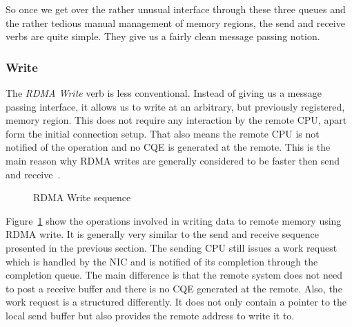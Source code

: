 So once we get over the rather unusual interface through these three queues and the rather tedious manual management of 
memory regions, the send and receive verbs are quite simple. They give us a fairly clean message passing notion.


\subsubsection{Write} \label{sec:bg:write}

The \emph{RDMA Write} verb is less conventional. Instead of giving us a message passing interface, it allows us to write at 
an arbitrary, but previously registered, memory region. This does not require any interaction by the remote CPU, apart form
the initial connection setup. 
That also means the remote CPU is not notified of the operation and no CQE is generated at the 
remote. This is the main reason why RDMA writes are generally considered to be faster then send and receive~\cite{anuj-guide}.


\begin{figure}[!ht]
\begin{center}
\end{center}
\caption{RDMA Write sequence}
\label{fig:seq-wrt}
\end{figure}

Figure~\ref{fig:seq-wrt} show the operations involved in writing data to remote memory using RDMA write. It is generally very
similar to the send and receive sequence presented in the previous section. The sending CPU still issues a work request which
is handled by the NIC and is notified of its completion through the completion queue.
The main difference is that the remote system does not need to post a receive buffer and there is no CQE generated at the 
remote. Also, the work request is a structured differently. It does not only contain a pointer to the local send buffer but
also provides the remote address to write it to.

